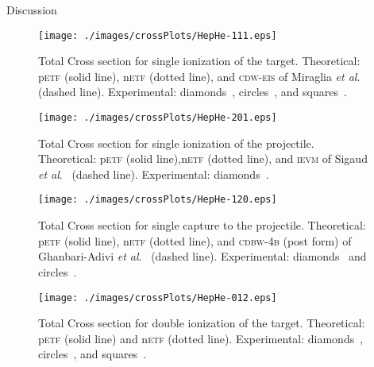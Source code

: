 \documentclass[aps, pra, reprint, groupedaddress, amsfonts,
               amsmath, amssymb, showpacs, nofootinbib]{revtex4-1}
\begin{document}
\begin{section}{Discussion \label{sec:disc}}

   \begin{figure}[t]
      \centering
      \texttt{[image: ./images/crossPlots/HepHe-111.eps]}
      \caption{Total Cross section for single ionization of the target.
               Theoretical: p\textsc{etf} (solid line), n\textsc{etf} (dotted line), and
                            \textsc{cdw-eis} of Miraglia \textit{et al}.~\cite{MG-10} (dashed line).
               Experimental: diamonds~\cite{Dub-89}, circles~\cite{FTFHLP-95}, and squares~\cite{DT-88}.
               \label{fig:cs111}}
   \end{figure}

   \begin{figure}[t]
      \centering
      \texttt{[image: ./images/crossPlots/HepHe-201.eps]}
      \caption{Total Cross section for single ionization of the projectile.
               Theoretical: p\textsc{etf} (solid line),n\textsc{etf} (dotted line), and
                            \textsc{ievm} of Sigaud \textit{et al}.~\cite{SM-03} (dashed line).
               Experimental: diamonds~\cite{Dub-89}. \label{fig:cs201}}
   \end{figure}

   \begin{figure}[t]
      \centering
      \texttt{[image: ./images/crossPlots/HepHe-120.eps]}
      \caption{Total Cross section for single capture to the projectile.
               Theoretical: p\textsc{etf} (solid line), n\textsc{etf} (dotted line), and
                            \textsc{cdbw-4b} (post form) of Ghanbari-Adivi \textit{et al}.~\cite{GAG15}
                            (dashed line).
               Experimental: diamonds~\cite{Dub-89} and circles~\cite{FTFHLP-95}. \label{fig:cs120}}
   \end{figure}

   \begin{figure}[t]
      \centering
      \texttt{[image: ./images/crossPlots/HepHe-012.eps]}
      \caption{Total Cross section for double ionization of the target.
               Theoretical: p\textsc{etf} (solid line) and n\textsc{etf} (dotted line).
               Experimental: diamonds~\cite{Dub-89}, circles~\cite{FTFHLP-95}, and squares~\cite{DT-88}.
               \label{fig:cs012}}
   \end{figure}


\end{section}
\end{document}
